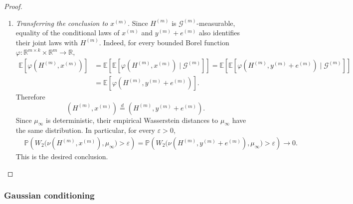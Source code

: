 \begin{proof}
\begin{enumerate}[wide]
            \item \emph{Transferring the conclusion to $x^{(m)}$.}
            Since $H^{(m)}$ is $\mathcal G^{(m)}$-measurable,
            equality of the conditional laws of $x^{(m)}$ and
            $y^{(m)}+e^{(m)}$ also identifies their joint laws
            with $H^{(m)}$.
            Indeed, for every bounded Borel function
            $\varphi:\mathbb R^{m\times k}\times\mathbb R^m
            \to\mathbb R$,
            \[
            \begin{aligned}
                \mathbb E[\varphi(H^{(m)},x^{(m)})]
                &=
                \mathbb E\left[
                    \mathbb E[
                        \varphi(H^{(m)},x^{(m)})
                        \mid\mathcal G^{(m)}
                    ]
                \right]
                =
                \mathbb E\left[
                    \mathbb E[
                        \varphi(H^{(m)},y^{(m)}+e^{(m)})
                        \mid\mathcal G^{(m)}
                    ]
                \right]\\
                &=
                \mathbb E[
                    \varphi(H^{(m)},y^{(m)}+e^{(m)})
                ].
            \end{aligned}
            \]
            Therefore
            \[
                (H^{(m)},x^{(m)})
                \stackrel d=
                (H^{(m)},y^{(m)}+e^{(m)}).
            \]
            Since $\mu_\infty$ is deterministic, their empirical
            Wasserstein distances to $\mu_\infty$ have the same
            distribution. In particular, for every $\varepsilon>0$,
            \[
            \begin{aligned}
                &\mathbb P\left(
                    W_2\bigl(\nu(H^{(m)},x^{(m)}),\mu_\infty\bigr)
                    >\varepsilon
                \right)
                =
                \mathbb P\left(
                    W_2\bigl(
                        \nu(H^{(m)},y^{(m)}+e^{(m)}),\mu_\infty
                    \bigr)>\varepsilon
                \right)
                \longrightarrow0.
            \end{aligned}
            \]
            This is the desired conclusion.
        \end{enumerate}
        \end{proof}

    \subsubsection{Gaussian conditioning}

